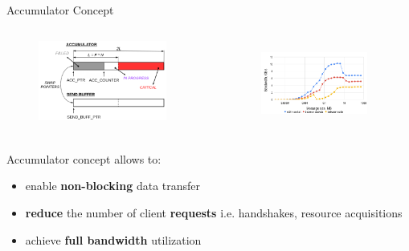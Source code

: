 \begin{frame}[t]{Accumulator Concept}
    \justifying
    \begin{columns}
        \begin{figure}[t]
            \centering
            \includegraphics[width=0.9\textwidth]{figures/chapter-3/accumulator-concept.png}
        \end{figure}
        \begin{figure}[t]
            \centering
            \includegraphics[width=0.9\textwidth]{figures/chapter-3/hw1-bandwidth.png} \label{fig:hw1-bandwidth}
        \end{figure}
    \end{columns}
    
    \spc
    Accumulator concept allows to:
    \begin{itemize}
        \item enable \textbf{non-blocking} data transfer
        \item \textbf{reduce} the number of client \textbf{requests} i.e. handshakes, resource acquisitions
        \item achieve \textbf{full bandwidth} utilization
        
    \end{itemize}

\end{frame}

